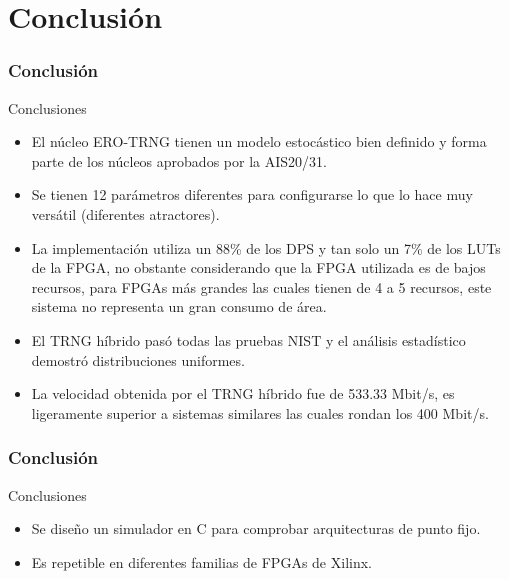 \documentclass[10pt]{beamer}
\begin{document}
\section{Conclusión}

\begin{frame}
    \frametitle{Conclusión}
    \begin{block}{Conclusiones}
        \justifying
        \begin{itemize}
        \item El núcleo ERO-TRNG tienen un modelo estocástico bien definido y forma parte de los núcleos aprobados por la AIS20/31.

        \item Se tienen 12 parámetros diferentes para configurarse lo que lo hace muy versátil (diferentes atractores).

        \item La implementación utiliza un 88\% de los DPS y tan solo un 7\% de los LUTs de la FPGA, no obstante considerando que la FPGA utilizada es de bajos recursos, para FPGAs más grandes las cuales tienen de 4 a 5 recursos, este sistema no representa un gran consumo de área.

        \item El TRNG híbrido pasó todas las pruebas NIST y el análisis estadístico demostró distribuciones uniformes.

        \item La velocidad obtenida por el TRNG híbrido fue de 533.33 Mbit/s, es ligeramente superior a sistemas similares las cuales rondan los 400 Mbit/s.

    \end{itemize}

	\end{block}
\end{frame}

\begin{frame}
    \frametitle{Conclusión}
    \begin{block}{Conclusiones}
        \justifying
        \begin{itemize}
        \item Se diseño un simulador en C para comprobar arquitecturas de punto fijo.
        \item Es repetible en diferentes familias de FPGAs de Xilinx.
    \end{itemize}

	\end{block}
\end{frame}
\end{document}
